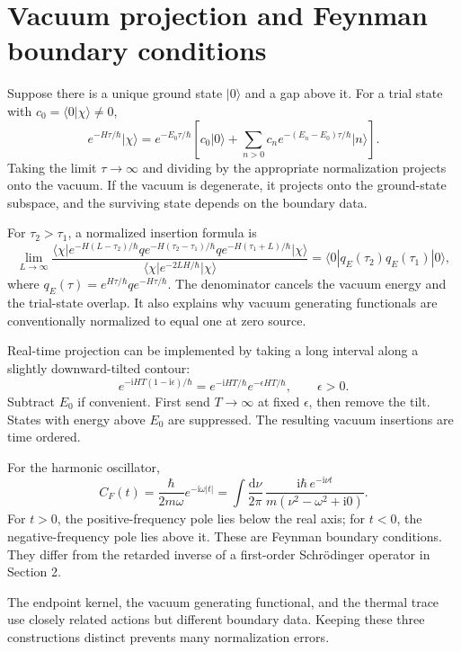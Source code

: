 \documentclass[11pt]{article}
\newcommand{\dd}{\mathrm d}
\newcommand{\ii}{\mathrm i}
\newcommand{\ket}[1]{\lvert#1\rangle}
\newcommand{\bra}[1]{\langle#1\rvert}
\newcommand{\module}[1]{\clearpage\section{#1}}
\begin{document}
\module{Vacuum projection and Feynman boundary conditions}
Suppose there is a unique ground state \(\ket0\) and a gap above it.
For a trial state with \(c_0=\langle0|\chi\rangle\neq0\),
\begin{equation}
 e^{-H\tau/\hbar}\ket\chi
 =e^{-E_0\tau/\hbar}
 \left[c_0\ket0+\sum_{n>0}c_ne^{-(E_n-E_0)\tau/\hbar}\ket n\right].
\end{equation}
Taking the limit $\tau\to \infty$ and dividing by the appropriate normalization projects onto the vacuum.
If the vacuum is degenerate, it projects onto the ground-state
subspace, and the surviving state depends on the boundary data.

For \(\tau_2>\tau_1\), a normalized insertion formula is
\begin{equation}
 \lim_{L\to\infty}
 \frac{\bra\chi e^{-H(L-\tau_2)/\hbar}q
 e^{-H(\tau_2-\tau_1)/\hbar}q
 e^{-H(\tau_1+L)/\hbar}\ket\chi}
 {\bra\chi e^{-2LH/\hbar}\ket\chi}
 =\langle0|q_E(\tau_2)q_E(\tau_1)|0\rangle,
                                                        \label{eq:projection}
\end{equation}
where \(q_E(\tau)=e^{H\tau/\hbar}qe^{-H\tau/\hbar}\).
The denominator cancels the vacuum energy and the trial-state overlap.
It also explains why vacuum generating functionals are conventionally
normalized to equal one at zero source.

Real-time projection can be implemented by taking a long interval
along a slightly downward-tilted contour:
\begin{equation}
 e^{-\ii H T(1-\ii\epsilon)/\hbar}
 =e^{-\ii HT/\hbar}e^{-\epsilon HT/\hbar},\qquad\epsilon>0.
\end{equation}
Subtract \(E_0\) if convenient. First send \(T\to\infty\) at fixed
\(\epsilon\), then remove the tilt. States with energy above \(E_0\)
are suppressed. The resulting vacuum insertions are time ordered.

For the harmonic oscillator,
\begin{equation}
 C_F(t)=\frac{\hbar}{2m\omega}e^{-\ii\omega|t|}
 =\int\frac{\dd\nu}{2\pi}\,
 \frac{\ii\hbar\,e^{-\ii\nu t}}{m(\nu^2-\omega^2+\ii0)}.
\end{equation}
For \(t>0\), the positive-frequency pole lies below the real axis;
for \(t<0\), the negative-frequency pole lies above it. These are
Feynman boundary conditions. They differ from the retarded inverse
of a first-order Schr\"odinger operator in Section 2.

The endpoint kernel, the vacuum generating functional, and the thermal
trace use closely related actions but different boundary data. Keeping
these three constructions distinct prevents many normalization errors.
\end{document}
